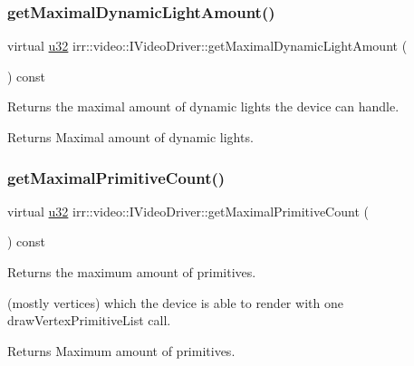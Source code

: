 \subsubsection{\texorpdfstring{get\+Maximal\+Dynamic\+Light\+Amount()}{getMaximalDynamicLightAmount()}\hspace{0.1cm}{\footnotesize\ttfamily [2/2]}}
{\footnotesize\ttfamily virtual \hyperlink{namespaceirr_a0416a53257075833e7002efd0a18e804}{u32} irr\+::video\+::\+I\+Video\+Driver\+::get\+Maximal\+Dynamic\+Light\+Amount (\begin{DoxyParamCaption}{ }\end{DoxyParamCaption}) const\hspace{0.3cm}{\ttfamily [pure virtual]}}



Returns the maximal amount of dynamic lights the device can handle. 

\begin{DoxyReturn}{Returns}
Maximal amount of dynamic lights. 
\end{DoxyReturn}
\mbox{\label{classirr_1_1video_1_1IVideoDriver_afd93e778fac79f7863da72a50e720f88}} 
\subsubsection{\texorpdfstring{get\+Maximal\+Primitive\+Count()}{getMaximalPrimitiveCount()}\hspace{0.1cm}{\footnotesize\ttfamily [1/2]}}
{\footnotesize\ttfamily virtual \hyperlink{namespaceirr_a0416a53257075833e7002efd0a18e804}{u32} irr\+::video\+::\+I\+Video\+Driver\+::get\+Maximal\+Primitive\+Count (\begin{DoxyParamCaption}{ }\end{DoxyParamCaption}) const\hspace{0.3cm}{\ttfamily [pure virtual]}}



Returns the maximum amount of primitives. 

(mostly vertices) which the device is able to render with one draw\+Vertex\+Primitive\+List call. \begin{DoxyReturn}{Returns}
Maximum amount of primitives. 
\end{DoxyReturn}
\mbox{\label{classirr_1_1video_1_1IVideoDriver_afd93e778fac79f7863da72a50e720f88}} 
